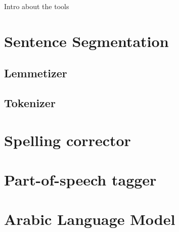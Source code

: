 Intro about the tools


\section{Sentence Segmentation}
\subsection{Lemmetizer}
\subsection{Tokenizer}
\section{Spelling corrector}
\section{Part-of-speech tagger}
\section{Arabic Language Model}
